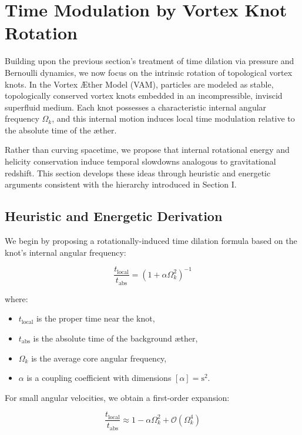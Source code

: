 \section{Time Modulation by Vortex Knot Rotation}

Building upon the previous section's treatment of time dilation via pressure and Bernoulli dynamics, we now focus on the intrinsic rotation of topological vortex knots. In the Vortex Æther Model (VAM), particles are modeled as stable, topologically conserved vortex knots embedded in an incompressible, inviscid superfluid medium. Each knot possesses a characteristic internal angular frequency $\Omega_k$, and this internal motion induces local time modulation relative to the absolute time of the æther.

Rather than curving spacetime, we propose that internal rotational energy and helicity conservation induce temporal slowdowns analogous to gravitational redshift. This section develops these ideas through heuristic and energetic arguments consistent with the hierarchy introduced in Section I.

\subsection{Heuristic and Energetic Derivation}

We begin by proposing a rotationally-induced time dilation formula based on the knot's internal angular frequency:

\begin{equation}
\frac{t_{\text{local}}}{t_{\text{abs}}} = \left(1 + \alpha \Omega_k^2 \right)^{-1}\label{eq:rotational_induced_time_dilation}
\end{equation}

where:

\begin{itemize}
\item $t_{\text{local}}$ is the proper time near the knot,
\item $t_{\text{abs}}$ is the absolute time of the background æther,
\item $\Omega_k$ is the average core angular frequency,
\item $\alpha$ is a coupling coefficient with dimensions $[\alpha] = \text{s}^2$.
\end{itemize}

For small angular velocities, we obtain a first-order expansion:

\begin{equation}
\frac{t_{\text{local}}}{t_{\text{abs}}} \approx 1 - \alpha \Omega_k^2 + \mathcal{O}(\Omega_k^4)\label{eq:rotational_induced_time_dilation_expansion}
\end{equation}

